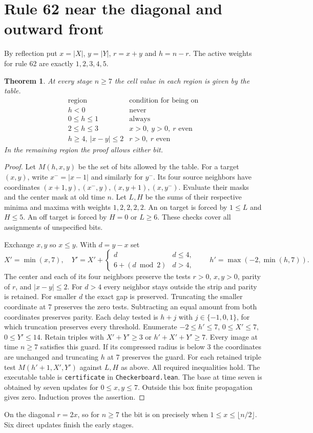 \documentclass[11pt]{article}
\newtheorem{theorem}{Theorem}
\begin{document}
\newpage
\section{Rule 62 near the diagonal and outward front}
By reflection put $x=|X|$, $y=|Y|$, $r=x+y$ and $h=n-r$.
The active weights for rule 62 are exactly $1,2,3,4,5$.
\begin{theorem}\label{strip}
At every stage $n\ge7$ the cell value in each region is given by the table.
\[
\begin{array}{c|l}
\text{region}&\text{condition for being on}\\\hline
h<0&\text{never}\\
0\le h\le1&\text{always}\\
2\le h\le3&x>0,\ y>0,\ r\text{ even}\\
h\ge4,\ |x-y|\le2&r>0,\ r\text{ even}
\end{array}
\]
In the remaining region the proof allows either bit.
\end{theorem}
\begin{proof}
Let $M(h,x,y)$ be the set of bits allowed by the table. For a target
$(x,y)$, write $x^- = |x-1|$ and similarly for $y^-$. Its four source neighbors
have coordinates $(x+1,y),(x^-,y),(x,y+1),(x,y^-)$.
Evaluate their masks and the center mask at old time $n$. Let $L,H$
be the sums of their respective minima and maxima with weights $1,2,2,2,2$.
An on target is forced by $1\le L$ and $H\le5$. An off target is forced
by $H=0$ or $L\ge6$. These checks cover all assignments of unspecified bits.

Exchange $x,y$ so $x\le y$. With $d=y-x$ set
\[
 X'=\min(x,7),\quad
 Y'=X'+\begin{cases}d&d\le4,\\6+(d\bmod 2)&d>4,\end{cases}
 \qquad h'=\max(-2,\min(h,7)).
\]
The center and each of its four neighbors preserve the tests $r>0$,
$x,y>0$, parity of $r$, and $|x-y|\le2$. For $d>4$ every neighbor
stays outside the strip and parity is retained. For smaller $d$ the exact
gap is preserved. Truncating the smaller coordinate at 7 preserves the
zero tests. Subtracting an equal amount from both coordinates preserves
parity. Each delay tested is $h+j$ with $j\in\{-1,0,1\}$, for which truncation
preserves every threshold.
Enumerate $-2\le h'\le7$, $0\le X'\le7$, $0\le Y'\le14$. Retain triples with
$X'+Y'\ge3$ or $h'+X'+Y'\ge7$. Every image at time $n\ge7$ satisfies
this guard. If its compressed radius is below 3 the coordinates are unchanged
and truncating $h$ at 7 preserves the guard.
For each retained triple test $M(h'+1,X',Y')$ against $L,H$ as above.
All required inequalities hold. The executable table is
\texttt{certificate} in \texttt{Checkerboard.lean}. The base at time seven
is obtained by seven updates for $0\le x,y\le7$. Outside this box finite
propagation gives zero. Induction proves the assertion.
\end{proof}
On the diagonal $r=2x$, so for $n\ge7$ the bit is on precisely when
$1\le x\le\lfloor n/2\rfloor$. Six direct updates finish the early stages.
\end{document}
